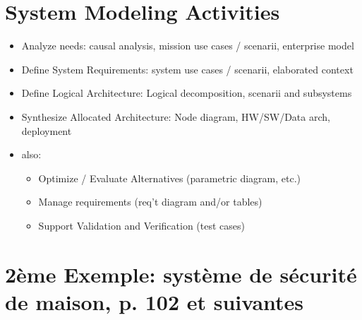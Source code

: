 \documentclass[11pt]{article}
\begin{document}
\section{System Modeling Activities}
\label{sec:org2465301}
\begin{itemize}
\item Analyze needs: causal analysis, mission use cases / scenarii, enterprise model
\item Define System Requirements: system use cases / scenarii, elaborated context
\item Define Logical Architecture: Logical decomposition, scenarii and subsystems
\item Synthesize Allocated Architecture: Node diagram, HW/SW/Data arch, deployment
\end{itemize}
\begin{itemize}
\item also:
\begin{itemize}
\item Optimize / Evaluate Alternatives (parametric diagram, etc.)
\item Manage requirements (req't diagram and/or tables)
\item Support Validation and Verification (test cases)
\end{itemize}
\end{itemize}
\section{2ème Exemple: système de sécurité de maison, p. 102 et suivantes}
\label{sec:org957d4f8}
\end{document}
